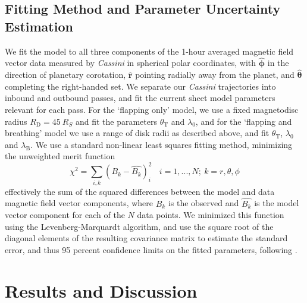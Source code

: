 \subsection{Fitting Method and Parameter Uncertainty Estimation}
We fit the model to all three components of the 1-hour averaged magnetic field vector data measured by \textit{Cassini} in spherical polar coordinates, with $\boldsymbol{\hat{\phi}}$ in the direction of planetary corotation, $\boldsymbol{\hat{r}}$ pointing radially away from the planet, and $\boldsymbol{\hat{\theta}}$ completing the right-handed set. We separate our \textit{Cassini} trajectories into inbound and outbound passes, and fit the current sheet model parameters relevant for each pass. For the `flapping only' model, we use a fixed magnetodisc radius $R_\mathrm{D} = \SI{45}{R_S}$ and fit the parameters $\theta_\mathrm{T}$ and $\lambda_0$, and for the `flapping and breathing' model we use a range of disk radii as described above, and fit $\theta_\mathrm{T}$, $\lambda_0$ and $\lambda_\mathrm{B}$. We use a standard non-linear least squares fitting method, minimizing the unweighted merit function
\begin{equation}
\chi^2 = \sum\limits_{i,k}(B_{k}-\hat{B_{k}})_i^2~~~~i = 1,...,N;~k = r,\theta,\phi
\end{equation}
effectively the sum of the squared differences between the model and data magnetic field vector components, where $B_k$ is the observed and $\hat{B_k}$ is the model vector component for each of the $N$ data points. We minimized this function using the Levenberg-Marquardt algorithm, and use the square root of the diagonal elements of the resulting covariance matrix to estimate the standard error, and thus 95 percent confidence limits on the fitted parameters, following \citet{press2007}.

\section{Results and Discussion}\label{equinox:sec:results}
